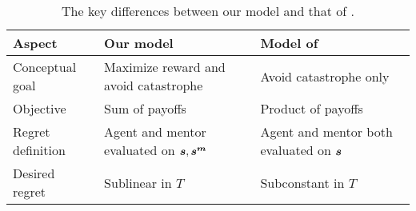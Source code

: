 
\begin{table*}[b!]
\centering
\caption{The key differences between our model and that of \citet{plaut_avoiding_2024}.}
\begin{tabular}{p{} p{} p{}}
\toprule
\textbf{Aspect} & \textbf{Our model} & \textbf{Model of \citet{plaut_avoiding_2024}} \\
\midrule
Conceptual goal & Maximize reward and avoid catastrophe & Avoid catastrophe only \\
\midrule
Objective & Sum of payoffs & Product of payoffs \\
\midrule
Regret definition & Agent and mentor evaluated on $\boldsymbol{s},\boldsymbol{s^m}$ & Agent and mentor both evaluated on $\boldsymbol{s}$ \\
\midrule
Desired regret & Sublinear in $T$ & Subconstant in $T$ \\
\bottomrule
\end{tabular}
\label{tab:model-comparison}
\end{table*}